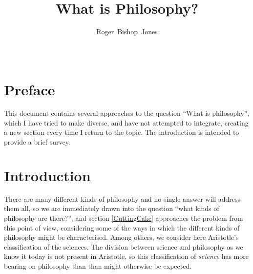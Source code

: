 \documentclass[10pt,titlepage]{article}
\title{What is Philosophy?}
\author{Roger~Bishop~Jones}
\date{\ }
\begin{document}
                               
\begin{titlepage}
\maketitle






\end{titlepage}

\setcounter{tocdepth}{2}
{\parskip-0pt\tableofcontents}



\section{Preface}

This document contains several approaches to the question ``What is philosophy'', which I have tried to make diverse, and have not attempted to integrate, creating a new section every time I return to the topic.
The introduction is intended to provide a brief survey.

\section{Introduction}

There are many different kinds of philosophy and no single answer will address them all, so we are immediately drawn into the question ``what kinds of philosophy are there?'', and section \ref{CuttingCake} approaches the problem from this point of view, considering some of the ways in which the different kinds of philosophy might be characterised.
Among others, we consider here Aristotle's classification of the sciences.
The division between science and philosophy as we know it today is not present in Aristotle, so this classification of {\it science} has more bearing on philosophy than than might otherwise be expected.
\end{document}
